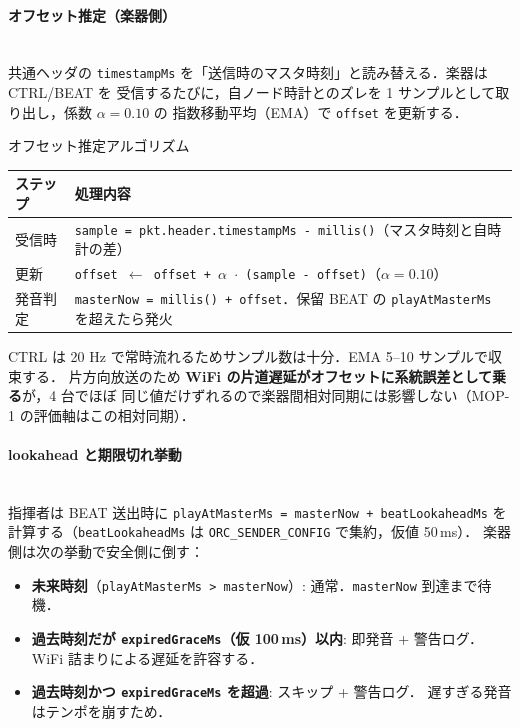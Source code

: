 \documentclass[lualatex,book,paper=a4paper,jafontsize=11.5pt,jafontscale=1.05]{jlreq}
\begin{document}
\paragraph{オフセット推定（楽器側）}\mbox{}\\
共通ヘッダの \texttt{timestampMs} を「送信時のマスタ時刻」と読み替える．楽器は CTRL/BEAT を
受信するたびに，自ノード時計とのズレを 1 サンプルとして取り出し，係数 $\alpha = 0.10$ の
指数移動平均（EMA）で \texttt{offset} を更新する．

\begin{apibox}{オフセット推定アルゴリズム}
\begin{tabular}{l p{}}
\toprule
\textbf{ステップ} & \textbf{処理内容} \\
\midrule
受信時 & \texttt{sample = pkt.header.timestampMs - millis()}（マスタ時刻と自時計の差） \\
更新   & \texttt{offset $\leftarrow$ offset + $\alpha$ $\cdot$ (sample - offset)}（$\alpha = 0.10$） \\
発音判定 & \texttt{masterNow = millis() + offset}．保留 BEAT の \texttt{playAtMasterMs} を超えたら発火 \\
\bottomrule
\end{tabular}
\end{apibox}

CTRL は 20 Hz で常時流れるためサンプル数は十分．EMA 5--10 サンプルで収束する．
片方向放送のため \textbf{WiFi の片道遅延がオフセットに系統誤差として乗る}が，4 台でほぼ
同じ値だけずれるので楽器間相対同期には影響しない（MOP-1 の評価軸はこの相対同期）．

\paragraph{lookahead と期限切れ挙動}\mbox{}\\
指揮者は BEAT 送出時に \texttt{playAtMasterMs = masterNow + beatLookaheadMs}
を計算する（\texttt{beatLookaheadMs} は \texttt{ORC\_SENDER\_CONFIG} で集約，仮値 50\,ms）．
楽器側は次の挙動で安全側に倒す：

\begin{itemize}
  \item \textbf{未来時刻}（\texttt{playAtMasterMs > masterNow}）: 通常．\texttt{masterNow} 到達まで待機．
  \item \textbf{過去時刻だが \texttt{expiredGraceMs}（仮 100\,ms）以内}: 即発音 + 警告ログ．
        WiFi 詰まりによる遅延を許容する．
  \item \textbf{過去時刻かつ \texttt{expiredGraceMs} を超過}: スキップ + 警告ログ．
        遅すぎる発音はテンポを崩すため．
\end{itemize}
\end{document}
